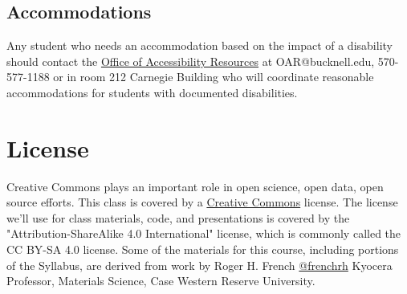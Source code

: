 \documentclass[11pt]{article} %
\begin{document}
  \subsection{Accommodations}
  
  Any student who needs an accommodation based on the impact of a disability should contact the \href{https://www.bucknell.edu/life-bucknell/diversity-equity-inclusion/accessibility-resources}{Office of Accessibility Resources} at OAR@bucknell.edu, 570-577-1188 or in room 212 Carnegie Building who will coordinate reasonable accommodations for students with documented disabilities. 


\section{License}
  
    Creative Commons plays an important role in open science, open data, open source efforts. This class is covered by a \href{"http://creativecommons.org/licenses/"}{Creative Commons} license. The license we'll use for class materials, code, and presentations is covered by the "Attribution-ShareAlike 4.0 International" license, which is commonly called the CC BY-SA 4.0 license. Some of the materials for this course, including portions of the Syllabus, are derived from work by Roger H. French \href{"https://twitter.com/frenchrh"}{@frenchrh} Kyocera Professor, Materials Science, Case Western Reserve University.


\end{document}
